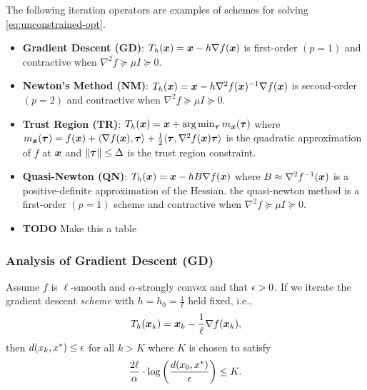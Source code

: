 \documentclass[10pt]{article}
\begin{document}
        The following iteration operators are examples of schemes for solving
        \eqref{eq:unconstrained-opt}.
        \begin{itemize}
            \item \textbf{Gradient Descent (GD)}: $T_h(\bm{x}) = \bm{x} - h \nabla f(\bm{x})$
            is first-order $(p = 1)$ and contractive when $\nabla^2 f \succeq \mu I \succeq 0$.
            \item \textbf{Newton's Method (NM)}: $T_h(\bm{x}) = \bm{x} - h \nabla^2 f(\bm{x})^{-1} \nabla f(\bm{x})$
            is second-order $(p = 2)$ and contractive when $\nabla^2 f \succeq \mu I \succeq 0$.
            \item \textbf{Trust Region (TR)}: $T_h(\bm{x}) = \bm{x} + \arg \min_{\bm{\tau}} m_{\bm{x}}(\bm{\tau})$
            where $m_{\bm{x}}(\bm{\tau}) = f(\bm{x}) + \langle \nabla f(\bm{x}), \bm{\tau} \rangle +
            \frac{1}{2} \langle \bm{\tau}, \nabla^2 f(\bm{x}) \bm{\tau} \rangle$ is the quadratic approximation
            of $f$ at $\bm{x}$ and $\|\bm{\tau}\| \leq \Delta$ is the trust region constraint.
            \item \textbf{Quasi-Newton (QN)}: $T_h(\bm{x}) = \bm{x} - h B \nabla f(\bm{x})$ where
            $B \approx \nabla^2 f^{-1}(\bm{x})$ is a positive-definite approximation of the Hessian.
            the quasi-newton method is a first-order $(p = 1)$ scheme and contractive when
            $\nabla^2 f \succeq \mu I \succeq 0$.
            \item \textbf{TODO} Make this a table
        \end{itemize}

        \medskip


        \subsubsection*{Analysis of Gradient Descent (GD)}


            \begin{theorem} Assume $f$ is $\ell$-smooth and $\alpha$-strongly convex and that $\epsilon > 0$.
                If we iterate the gradient descent \emph{scheme} with $h = h_0 = \frac{1}{\ell}$ held fixed, i.e.,
                $$
                    T_{h}(\bm{x}_k) = \bm{x}_k - \frac{1}{\ell} \nabla f(\bm{x}_k),
                $$
                then $d(x_k, x^*) \leq \epsilon$ for all $k > K$ where $K$ is chosen to satisfy
                $$
                    \frac{2\ell}{\alpha} \cdot \log\left(\frac{d(x_0, x^*)}{\epsilon}\right) \leq K.
                $$
            \end{theorem}
\end{document}
